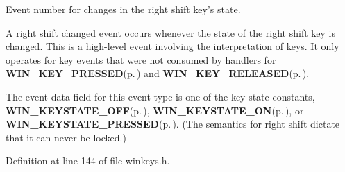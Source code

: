 Event number for changes in the right shift key's state. 

A right shift changed event occurs whenever the state of the right shift key is changed. This is a high-level event involving the interpretation of keys. It only operates for key events that were not consumed by handlers for {\bf WIN\_\-KEY\_\-PRESSED}{\rm (p.\,\pageref{winkeys_8h_a0})} and {\bf WIN\_\-KEY\_\-RELEASED}{\rm (p.\,\pageref{winkeys_8h_a1})}.

The event data field for this event type is one of the key state constants, {\bf WIN\_\-KEYSTATE\_\-OFF}{\rm (p.\,\pageref{winkeys_8h_a6})}, {\bf WIN\_\-KEYSTATE\_\-ON}{\rm (p.\,\pageref{winkeys_8h_a7})}, or {\bf WIN\_\-KEYSTATE\_\-PRESSED}{\rm (p.\,\pageref{winkeys_8h_a9})}. (The semantics for right shift dictate that it can never be locked.) 

Definition at line 144 of file winkeys.h.